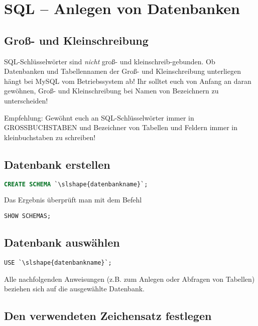 \lstset{style=mySQL}

\section{SQL -- Anlegen von Datenbanken}

\subsection{Groß- und Kleinschreibung}

SQL-Schlüsselwörter sind \textit{nicht} groß- und kleinschreib-gebunden. Ob
Datenbanken und Tabellennamen der Groß- und Kleinschreibung unterliegen hängt
bei MySQL vom Betriebssystem ab! Ihr solltet euch von Anfang an daran gewöhnen,
Groß- und Kleinschreibung bei Namen von Bezeichnern zu unterscheiden!

Empfehlung: Gewöhnt euch an SQL-Schlüsselwörter immer in GROSSBUCHSTABEN und
Bezeichner von Tabellen und Feldern immer in kleinbuchstaben zu schreiben!


\subsection{Datenbank erstellen}

\begin{lstlisting}[language=SQL]
CREATE SCHEMA `\slshape{datenbankname}`;
\end{lstlisting}

Das Ergebnis überprüft man mit dem Befehl

\begin{lstlisting}
SHOW SCHEMAS;
\end{lstlisting}


\subsection{Datenbank auswählen}

\begin{lstlisting}
USE `\slshape{datenbankname}`;
\end{lstlisting}

Alle nachfolgenden Anweisungen (z.B. zum Anlegen oder Abfragen von Tabellen)
beziehen sich auf die ausgewählte Datenbank.


\subsection{Den verwendeten Zeichensatz festlegen}

